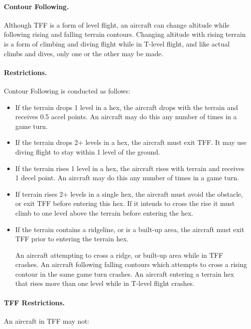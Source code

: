 \paragraph{Contour Following.} Although TFF is a form of level flight, an aircraft can change altitude while following rising and falling terrain contours.  Changing altitude with rising terrain is a form of climbing and diving flight while in T-level flight, and like actual climbs and dives, only one or the other may be made.  

\paragraph{Restrictions.} Contour Following is conducted as follows:

\begin{itemize}

    \item If the terrain drops 1 level in a hex, the aircraft drops with the terrain and receives 0.5 accel points. An aircraft may do this any number of times in a game turn.

    \item If the terrain drops 2+ levels in a hex, the aircraft must exit TFF. It may use diving flight to stay within 1 level of the ground.
    
    \item If the terrain rises 1 level in a hex, the aircraft rises with terrain and receives 1 decel point. An aircraft may do this any number of times in a game turn.

    \item If terrain rises 2+ levels in a single hex, the aircraft must avoid the obstacle, or exit TFF before entering this hex. If it intends to cross the rise it must climb to one level above the terrain before entering the hex.

    \item If the terrain contains a ridgeline, or is a built-up area, the aircraft must exit TFF prior to entering the terrain hex.

    An aircraft attempting to cross a ridge, or built-up area while in TFF crashes. An aircraft following falling contours which attempts to cross a rising contour in the same game turn crashes. An aircraft entering a terrain hex that rises more than one level while in T-level flight crashes.

\end{itemize}

\paragraph{TFF Restrictions.}  An aircraft in TFF may not:

